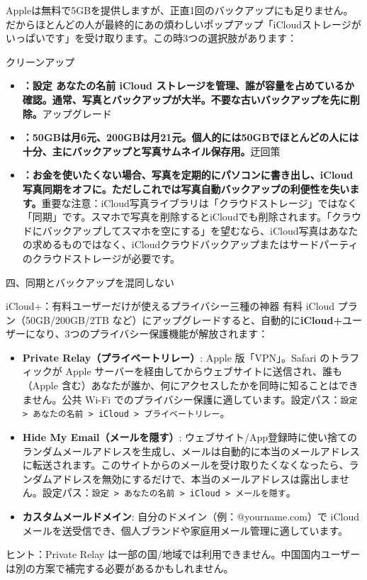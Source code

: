 
Appleは無料で5GBを提供しますが、正直1回のバックアップにも足りません。だからほとんどの人が最終的にあの煩わしいポップアップ「iCloudストレージがいっぱいです」を受け取ります。この時3つの選択肢があります：

クリーンアップ

\begin{itemize}
  \item \textbf{：設定 あなたの名前 iCloud ストレージを管理、誰が容量を占めているか確認。通常、写真とバックアップが大半。不要な古いバックアップを先に削除。}アップグレード
  \item \textbf{：50GBは月6元、200GBは月21元。個人的には50GBでほとんどの人には十分、主にバックアップと写真サムネイル保存用。}迂回策
  \item \textbf{：お金を使いたくない場合、写真を定期的にパソコンに書き出し、iCloud写真同期をオフに。ただしこれでは写真自動バックアップの利便性を失います。}重要な注意：iCloud写真ライブラリは「クラウドストレージ」ではなく「同期」です。スマホで写真を削除するとiCloudでも削除されます。「クラウドにバックアップしてスマホを空にする」を望むなら、iCloud写真はあなたの求めるものではなく、iCloudクラウドバックアップまたはサードパーティのクラウドストレージが必要です。
\end{itemize}

四、同期とバックアップを混同しない

\begin{tcbinfo}{iCloud+：有料ユーザーだけが使えるプライバシー三種の神器}
有料 iCloud プラン（50GB/200GB/2TB など）にアップグレードすると、自動的に\textbf{iCloud+}ユーザーになり、3つのプライバシー保護機能が解放されます：

\begin{itemize}
  \item \textbf{Private Relay（プライベートリレー）}: Apple 版「VPN」。Safari のトラフィックが Apple サーバーを経由してからウェブサイトに送信され、誰も（Apple 含む）あなたが誰か、何にアクセスしたかを同時に知ることはできません。公共 Wi-Fi でのプライバシー保護に適しています。設定パス：\texttt{設定 > あなたの名前 > iCloud > プライベートリレー}。
  \item \textbf{Hide My Email（メールを隠す）}: ウェブサイト/App登録時に使い捨てのランダムメールアドレスを生成し、メールは自動的に本当のメールアドレスに転送されます。このサイトからのメールを受け取りたくなくなったら、ランダムアドレスを無効にするだけで、本当のメールアドレスは露出しません。設定パス：\texttt{設定 > あなたの名前 > iCloud > メールを隠す}。
  \item \textbf{カスタムメールドメイン}: 自分のドメイン（例：@yourname.com）で iCloud メールを送受信でき、個人ブランドや家庭用メール管理に適しています。
\end{itemize}

ヒント：Private Relay は一部の国/地域では利用できません。中国国内ユーザーは別の方案で補完する必要があるかもしれません。

\end{tcbinfo}

